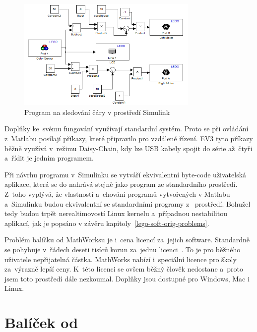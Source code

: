 \begin{figure}[h]
	\centering
	\includegraphics[width=330px]{images/mathworks-simulink_line-tracking-model.png}
	\caption[Program na sledování čáry v prostředí Simulink]{Program na sledování čáry v prostředí Simulink\protect\footnotemark}
	\label{fig:mathworks-simulink_line-tracking-model}
\end{figure}


Doplňky ke~svému fungování využívají standardní \lego{} systém. 
Proto se při ovládání  z~Matlabu posílají příkazy, které \lego{} připravilo pro vzdálené řízení. 
EV3 tyto příkazy běžně využívá v~režimu Daisy-Chain, kdy lze USB kabely spojit do série až~čtyři  a~řídit je jedním programem.     

Při návrhu programu v~Simulinku se vytváří ekvivalentní byte-code uživatelská aplikace, která se do  nahrává stejně jako program ze standardního \lego{} prostředí. 
Z~toho vyplývá, že vlastností a~chování programů vytvořených v Matlabu a~Simulinku budou ekvivalentní se standardními programy z~\lego{} prostředí.
Bohužel tedy budou trpět nerealtimovostí Linux kernelu a~případnou nestabilitou aplikací, jak je popsáno v závěru kapitoly~\ref{lego-soft-orig-problems}.  

Problém balíčku od MathWorksu je i~cena licencí za~jejich software. 
Standardně se pohybuje v~řádech deseti tisíců korun za~jednu licenci~\cite{legoProgramingPlatform_MathWork_Humusoft-price}.
To je pro běžného uživatele nepřijatelná částka. 
MathWorks nabízí i~speciální licence pro školy za~výrazně lepší ceny. 
K~této licenci se ovšem běžný člověk nedostane a~proto jsem toto prostředí dále nezkoumal.
Doplňky jsou dostupné pro Windows, Mac i  Linux. 
 

\section{Balíček od \NI}

